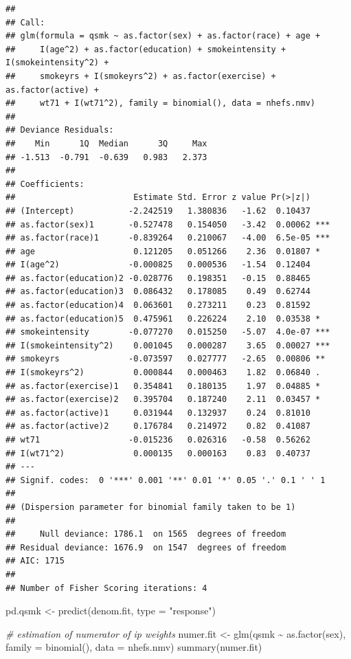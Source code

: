 \documentclass[
  10pt,
]{book}
\newenvironment{Shaded}{\begin{snugshade}}{\end{snugshade}}
\newcommand{\AttributeTok}[1]{\textcolor[rgb]{0.77,0.63,0.00}{#1}}
\newcommand{\CommentTok}[1]{\textcolor[rgb]{0.56,0.35,0.01}{\textit{#1}}}
\newcommand{\FunctionTok}[1]{\textcolor[rgb]{0.00,0.00,0.00}{#1}}
\newcommand{\NormalTok}[1]{#1}
\newcommand{\OtherTok}[1]{\textcolor[rgb]{0.56,0.35,0.01}{#1}}
\newcommand{\SpecialCharTok}[1]{\textcolor[rgb]{0.00,0.00,0.00}{#1}}
\newcommand{\StringTok}[1]{\textcolor[rgb]{0.31,0.60,0.02}{#1}}
\begin{document}
\begin{verbatim}
## 
## Call:
## glm(formula = qsmk ~ as.factor(sex) + as.factor(race) + age + 
##     I(age^2) + as.factor(education) + smokeintensity + I(smokeintensity^2) + 
##     smokeyrs + I(smokeyrs^2) + as.factor(exercise) + as.factor(active) + 
##     wt71 + I(wt71^2), family = binomial(), data = nhefs.nmv)
## 
## Deviance Residuals: 
##    Min      1Q  Median      3Q     Max  
## -1.513  -0.791  -0.639   0.983   2.373  
## 
## Coefficients:
##                        Estimate Std. Error z value Pr(>|z|)    
## (Intercept)           -2.242519   1.380836   -1.62  0.10437    
## as.factor(sex)1       -0.527478   0.154050   -3.42  0.00062 ***
## as.factor(race)1      -0.839264   0.210067   -4.00  6.5e-05 ***
## age                    0.121205   0.051266    2.36  0.01807 *  
## I(age^2)              -0.000825   0.000536   -1.54  0.12404    
## as.factor(education)2 -0.028776   0.198351   -0.15  0.88465    
## as.factor(education)3  0.086432   0.178085    0.49  0.62744    
## as.factor(education)4  0.063601   0.273211    0.23  0.81592    
## as.factor(education)5  0.475961   0.226224    2.10  0.03538 *  
## smokeintensity        -0.077270   0.015250   -5.07  4.0e-07 ***
## I(smokeintensity^2)    0.001045   0.000287    3.65  0.00027 ***
## smokeyrs              -0.073597   0.027777   -2.65  0.00806 ** 
## I(smokeyrs^2)          0.000844   0.000463    1.82  0.06840 .  
## as.factor(exercise)1   0.354841   0.180135    1.97  0.04885 *  
## as.factor(exercise)2   0.395704   0.187240    2.11  0.03457 *  
## as.factor(active)1     0.031944   0.132937    0.24  0.81010    
## as.factor(active)2     0.176784   0.214972    0.82  0.41087    
## wt71                  -0.015236   0.026316   -0.58  0.56262    
## I(wt71^2)              0.000135   0.000163    0.83  0.40737    
## ---
## Signif. codes:  0 '***' 0.001 '**' 0.01 '*' 0.05 '.' 0.1 ' ' 1
## 
## (Dispersion parameter for binomial family taken to be 1)
## 
##     Null deviance: 1786.1  on 1565  degrees of freedom
## Residual deviance: 1676.9  on 1547  degrees of freedom
## AIC: 1715
## 
## Number of Fisher Scoring iterations: 4
\end{verbatim}

\begin{Shaded}
\begin{Highlighting}[]
\NormalTok{pd.qsmk }\OtherTok{\textless{}{-}} \FunctionTok{predict}\NormalTok{(denom.fit, }\AttributeTok{type =} \StringTok{"response"}\NormalTok{)}

\CommentTok{\# estimation of numerator of ip weights}
\NormalTok{numer.fit }\OtherTok{\textless{}{-}}
  \FunctionTok{glm}\NormalTok{(qsmk }\SpecialCharTok{\textasciitilde{}} \FunctionTok{as.factor}\NormalTok{(sex), }\AttributeTok{family =} \FunctionTok{binomial}\NormalTok{(), }\AttributeTok{data =}\NormalTok{ nhefs.nmv)}
\FunctionTok{summary}\NormalTok{(numer.fit)}
\end{Highlighting}
\end{Shaded}
\end{document}
